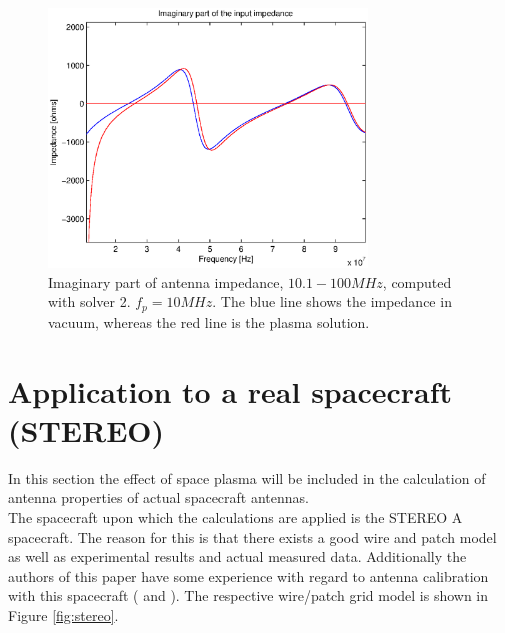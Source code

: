 \documentclass[two-coloumn,ras]{agutex}
\begin{document}
\begin{article}
\begin{figure}
\noindent\includegraphics[width=20pc]{imps_dipole_solver2_imag2.eps}
\caption{Imaginary part of antenna impedance, $10.1 - 100 MHz$, computed with solver 2. $f_p=10MHz$. The blue line shows the impedance in vacuum, whereas the red line is the plasma solution.}
\label{fig:impedances_dipole_solver2_2_imag}
\end{figure}

\section{Application to a real spacecraft (STEREO)}
In this section the effect of space plasma will be included in the calculation of antenna properties of actual spacecraft antennas.\\

The spacecraft upon which the calculations are applied is the STEREO A spacecraft. The reason for this is that there exists a good wire and patch model as well as experimental results and actual measured data. Additionally the authors of this paper have some experience with regard to antenna calibration with this spacecraft (\cite{ossi09} and \cite{panchenko10}). The respective wire/patch grid model is shown in Figure \ref{fig:stereo}.\\


\end{article}
\end{document}
